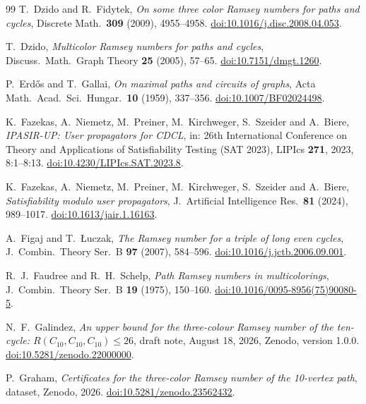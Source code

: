 \documentclass[11pt]{article}
\theoremstyle{definition}
\theoremstyle{remark}
\begin{document}
\begin{thebibliography}{99}
T.~Dzido and R.~Fidytek, \emph{On some three color Ramsey numbers for paths
and cycles}, Discrete Math.\ \textbf{309} (2009), 4955--4958.
\href{https://doi.org/10.1016/j.disc.2008.04.053}{doi:10.1016/j.disc.2008.04.053}.

T.~Dzido, \emph{Multicolor Ramsey numbers for paths and cycles}, Discuss.\
Math.\ Graph Theory \textbf{25} (2005), 57--65.
\href{https://doi.org/10.7151/dmgt.1260}{doi:10.7151/dmgt.1260}.

P.~Erdős and T.~Gallai, \emph{On maximal paths and circuits of graphs},
Acta Math.\ Acad.\ Sci.\ Hungar.\ \textbf{10} (1959), 337--356.
\href{https://doi.org/10.1007/BF02024498}{doi:10.1007/BF02024498}.

K.~Fazekas, A.~Niemetz, M.~Preiner, M.~Kirchweger, S.~Szeider and
A.~Biere, \emph{IPASIR-UP: User propagators for CDCL}, in: 26th
International Conference on Theory and Applications of Satisfiability
Testing (SAT 2023), LIPIcs \textbf{271}, 2023, 8:1--8:13.
\href{https://doi.org/10.4230/LIPIcs.SAT.2023.8}{doi:10.4230/LIPIcs.SAT.2023.8}.

K.~Fazekas, A.~Niemetz, M.~Preiner, M.~Kirchweger, S.~Szeider and
A.~Biere, \emph{Satisfiability modulo user propagators}, J.~Artificial
Intelligence Res.\ \textbf{81} (2024), 989--1017.
\href{https://doi.org/10.1613/jair.1.16163}{doi:10.1613/jair.1.16163}.

A.~Figaj and T.~Łuczak, \emph{The Ramsey number for a triple of long even
cycles}, J.~Combin.\ Theory Ser.~B \textbf{97} (2007), 584--596.
\href{https://doi.org/10.1016/j.jctb.2006.09.001}{doi:10.1016/j.jctb.2006.09.001}.

R.~J.~Faudree and R.~H.~Schelp, \emph{Path Ramsey numbers in
multicolorings}, J.~Combin.\ Theory Ser.~B \textbf{19} (1975), 150--160.
\href{https://doi.org/10.1016/0095-8956(75)90080-5}{doi:10.1016/0095-8956(75)90080-5}.

N.~F.~Galindez, \emph{An upper bound for the three-colour Ramsey number of the ten-cycle: $R(C_{10},C_{10},C_{10})\le 26$}, draft note, August 18, 2026, Zenodo, version 1.0.0.
\href{https://doi.org/10.5281/zenodo.22000000}{doi:10.5281/zenodo.22000000}.

P.~Graham, \emph{Certificates for the three-color Ramsey number of the
10-vertex path}, dataset, Zenodo, 2026.
\href{https://doi.org/10.5281/zenodo.23562432}{doi:10.5281/zenodo.23562432}.


\end{thebibliography}
\end{document}
